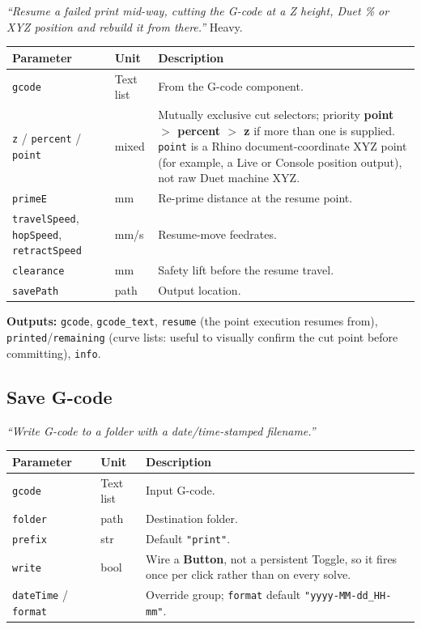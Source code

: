 \documentclass[11pt]{article}
\newcommand{\param}[1]{\texttt{#1}}
\begin{document}
\emph{``Resume a failed print mid-way, cutting the G-code at a Z height,
Duet \% or XYZ position and rebuild it from there.''} Heavy.

\begin{longtable}{@{}p{3.4cm}p{2.0cm}p{7.9cm}@{}}
\toprule
\textbf{Parameter} & \textbf{Unit} & \textbf{Description} \\
\midrule
\endhead
\param{gcode} & Text list & From the G-code component. \\
\param{z} / \param{percent} / \param{point} & mixed & Mutually exclusive cut selectors; priority \textbf{point $>$ percent $>$ z} if more than one is supplied. \param{point} is a Rhino document-coordinate XYZ point (for example, a Live or Console position output), not raw Duet machine XYZ. \\
\param{primeE} & mm & Re-prime distance at the resume point. \\
\param{travelSpeed}, \param{hopSpeed}, \param{retractSpeed} & mm/s & Resume-move feedrates. \\
\param{clearance} & mm & Safety lift before the resume travel. \\
\param{savePath} & path & Output location. \\
\bottomrule
\end{longtable}

\textbf{Outputs:} \param{gcode}, \param{gcode\_text}, \param{resume}
(the point execution resumes from), \param{printed}/\param{remaining}
(curve lists: useful to visually confirm the cut point before
committing), \param{info}.

\subsection{Save G-code}

\emph{``Write G-code to a folder with a date/time-stamped filename.''}

\begin{longtable}{@{}p{3.4cm}p{2.0cm}p{7.9cm}@{}}
\toprule
\textbf{Parameter} & \textbf{Unit} & \textbf{Description} \\
\midrule
\endhead
\param{gcode} & Text list & Input G-code. \\
\param{folder} & path & Destination folder. \\
\param{prefix} & str & Default \texttt{"print"}. \\
\param{write} & bool & Wire a \textbf{Button}, not a persistent Toggle, so it fires once per click rather than on every solve. \\
\param{dateTime} / \param{format} & & Override group; \param{format} default \texttt{"yyyy-MM-dd\_HH-mm"}. \\
\bottomrule
\end{longtable}
\end{document}
